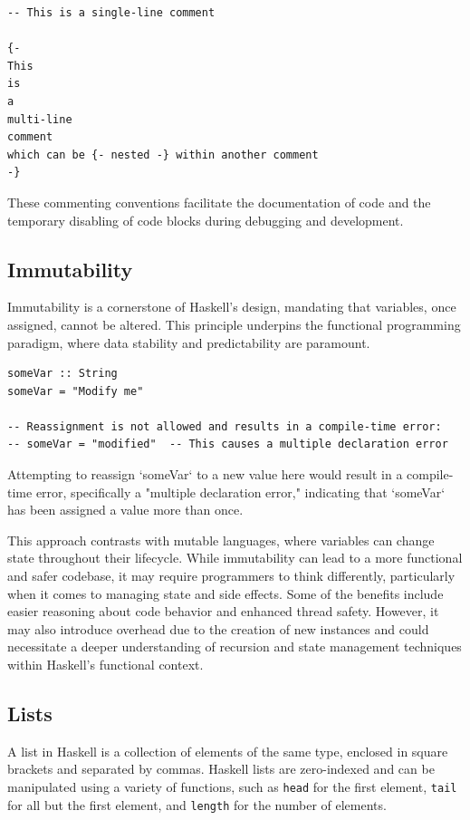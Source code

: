 \documentclass[a4paper, 10pt]{article}
\begin{document}
            \lstset{language=Haskell}
            \begin{lstlisting}
-- This is a single-line comment

{-
This
is
a
multi-line
comment
which can be {- nested -} within another comment
-}
            \end{lstlisting}

            These commenting conventions facilitate the documentation of code and the temporary disabling of code blocks during debugging and development.

        \subsection{Immutability}

            Immutability is a cornerstone of Haskell's design, mandating that variables, once assigned, cannot be altered. This principle underpins the functional programming paradigm, where data stability and predictability are paramount.

            \lstset{language=Haskell}
            \begin{lstlisting}
someVar :: String
someVar = "Modify me"

-- Reassignment is not allowed and results in a compile-time error:
-- someVar = "modified"  -- This causes a multiple declaration error
            \end{lstlisting}

            Attempting to reassign `someVar` to a new value here would result in a compile-time error, specifically a "multiple declaration error," indicating that `someVar` has been assigned a value more than once.

            This approach contrasts with mutable languages, where variables can change state throughout their lifecycle. While immutability can lead to a more functional and safer codebase, it may require programmers to think differently, particularly when it comes to managing state and side effects. Some of the benefits include easier reasoning about code behavior and enhanced thread safety. However, it may also introduce overhead due to the creation of new instances and could necessitate a deeper understanding of recursion and state management techniques within Haskell's functional context.


    \subsection{Lists}
        A list in Haskell is a collection of elements of the same type, enclosed in square brackets and separated by commas. Haskell lists are zero-indexed and can be manipulated using a variety of functions, such as \texttt{head} for the first element, \texttt{tail} for all but the first element, and \texttt{length} for the number of elements.
\end{document}
